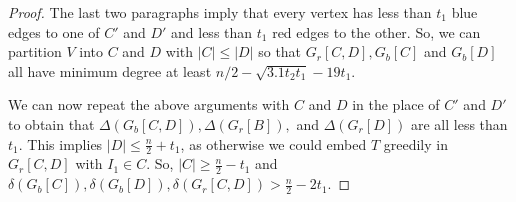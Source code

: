 \documentclass[10pt,a4paper]{amsart}
\begin{document}
\begin{proof}
The last two paragraphs imply that every vertex has less than  $t_1$ blue edges to one of $C'$ 
and $D'$ and less than  $t_1$ red edges to the other. 
So, we can partition $V$ into $C$ and $D$ with $|C| \le |D|$ so that $G_r[C,D], G_b[C]$ and $G_b[D]$ all have minimum  degree at least  $n/2-\sqrt{3.1t_2t_1}-19t_1$.

We can now repeat the above arguments with $C$ and $D$ in the place of $C '$ and $D'$ to obtain that 
  $\Delta(G_b[C,D]), \Delta(G_r[B]),$ and $\Delta(G_r[D])$ are all less than $t_1$.  This implies $|D| \le \frac{n}{2}+t_1$, as otherwise we could embed $T$ greedily in $G_r[C,D]$ with $I_1 \in C$. So, $|C| \ge \frac{n}{2}-t_1$
and $\delta(G_b[C]), \delta(G_b[D]), \delta(G_r[C,D]) > \frac{n}{2}-2t_1$. 
\end{proof}
\end{document}

